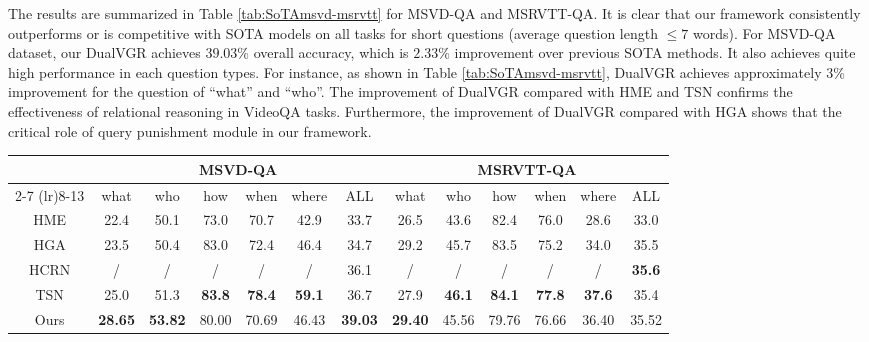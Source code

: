\documentclass[journal]{IEEEtran}
\begin{document}
The results are summarized in Table \ref{tab:SoTAmsvd-msrvtt} for MSVD-QA and MSRVTT-QA. It is clear that our framework consistently outperforms or is competitive with SOTA models on all tasks for short questions (average question length $\leq 7$ words). For MSVD-QA dataset, our DualVGR achieves $39.03\%$ overall accuracy, which is $2.33\%$ improvement over previous SOTA methods. It also achieves quite high performance in each question types. For instance, as shown in Table \ref{tab:SoTAmsvd-msrvtt}, DualVGR achieves approximately 3\% improvement for the question of ``what'' and ``who''. The improvement of DualVGR compared with HME and TSN confirms the effectiveness of relational reasoning in VideoQA tasks. Furthermore, the improvement of DualVGR compared with HGA shows that the critical role of query punishment module in our framework.
\begin{table*}[t]
    \centering
    \caption{Performance comparison to the state-of-the-art methods on MSVD-QA and MSRVTT-QA.}
    \begin{tabular}{ccccccccccccc}
    \hline
        \multirow{2}{*}{\qquad} & \multicolumn{6}{c}{MSVD-QA} & \multicolumn{6}{c}{MSRVTT-QA} \\\cmidrule(lr){2-7} \cmidrule(lr){8-13}
        &what&who&how&when&where&ALL&what&who&how&when&where&ALL\\\hline
        HME \cite{fan2019heterogeneous}&22.4&50.1&73.0&70.7&42.9&33.7&26.5&43.6&82.4&76.0&28.6&33.0 \\
        HGA \cite{jiang2020reasoning}&23.5&50.4&83.0&72.4&46.4&34.7&29.2&45.7&83.5&75.2&34.0&35.5 \\
        HCRN \cite{le2020hierarchical}&/&/&/&/&/&36.1&/&/&/&/&/&\textbf{35.6}\\
        TSN \cite{yang2019question}&25.0&51.3&\textbf{83.8}&\textbf{78.4}&\textbf{59.1}&36.7&27.9&\textbf{46.1}&\textbf{84.1}&\textbf{77.8}&\textbf{37.6}&35.4\\\hline
        Ours&\textbf{28.65}&\textbf{53.82}&80.00&70.69&46.43&\textbf{39.03}&\textbf{29.40}&45.56&79.76&76.66&36.40&35.52\\\hline
    \end{tabular}
    \label{tab:SoTAmsvd-msrvtt}
\end{table*}
\end{document}
